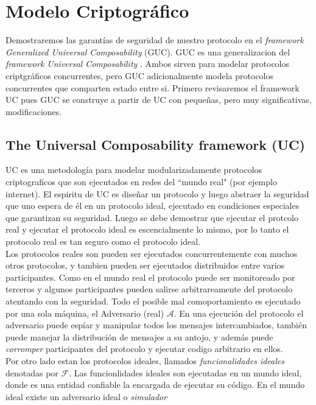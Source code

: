 \chapter{Modelo Criptográfico}

Demostraremos las garantías de seguridad de nuestro protocolo en el
\textit{framework Generalized Universal Composability} (GUC). GUC \cite{conf/tcc/CanettiDPW07}
es una generalizacion del \textit{framework Universal Composability}
\cite{conf/focs/Canetti01}. Ambos sirven para modelar protocolos criptgráficos concurrentes,
pero GUC adicionalmente modela protocolos concurrentes que comparten estado entre si.
Primero revisaremos el framework UC pues GUC se construye a partir de UC con pequeñas,
pero muy significativas, modificaciones.\\

\section{The Universal Composability framework (UC)}
UC es una metodología para modelar modularizadamente protocolos criptograficos que son ejecutados en redes
del ``mundo real" (por ejemplo internet). El espiritu de UC es diseñar un protocolo y luego abstraer la
seguridad que uno espera de él en un protocolo ideal, ejecutado en condiciones especiales que garantizan
su seguridad. Luego se debe demostrar que ejecutar el protcolo real y ejecutar el protocolo ideal es
escencialmente lo mismo, por lo tanto el protocolo real es tan seguro como el protocolo ideal.\\
Los protocolos reales son pueden ser ejecutados concurrentemente con muchos otros protocolos,
y tambien pueden ser ejecutados distribuidos entre varios participantes.
Como en el mundo real el protocolo puede ser monitoreado por terceros y algunos participantes pueden salirse
arbitrareamente del protocolo atentando con la seguridad. Todo el posible mal comoportamiento es ejecutado por una sola
máquina, el Adversario (real) $\mathcal{A}$. En una ejecución del protocolo el adversario puede espíar y
manipular todos los mensajes intercambiados, también puede manejar la distribución de mensajes a su antojo,
y además puede \textit{corromper} participantes del protocolo y ejecutar codigo arbitrario en ellos.\\
Por otro lado estan los protocolos ideales, llamados \textit{funcionalidades ideales} denotadas por 
$\mathcal{F}$. Las funcionlidades ideales son ejecutadas en un mundo ideal, donde es una entidad confiable
la encargada de ejecutar su código. En el mundo ideal existe un adversario ideal o \textit{simulador}
